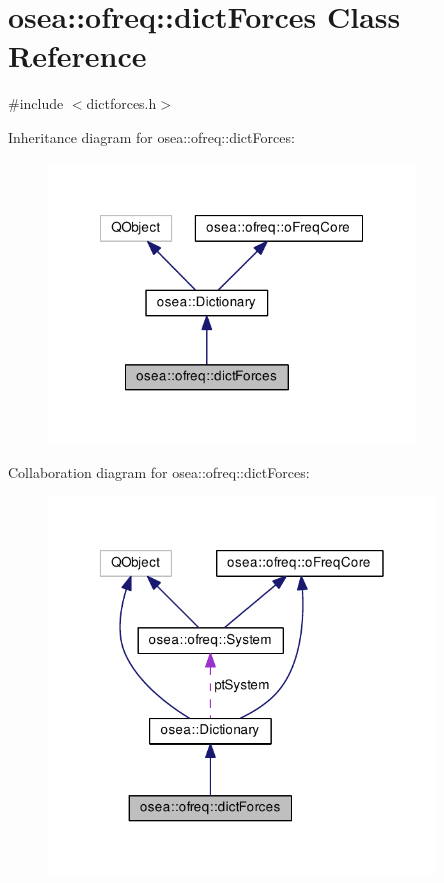 \hypertarget{classosea_1_1ofreq_1_1dict_forces}{\section{osea\-:\-:ofreq\-:\-:dict\-Forces Class Reference}
\label{classosea_1_1ofreq_1_1dict_forces}
}


{\ttfamily \#include $<$dictforces.\-h$>$}



Inheritance diagram for osea\-:\-:ofreq\-:\-:dict\-Forces\-:
\nopagebreak
\begin{figure}[H]
\begin{center}
\leavevmode
\includegraphics[width=275pt]{classosea_1_1ofreq_1_1dict_forces__inherit__graph}
\end{center}
\end{figure}


Collaboration diagram for osea\-:\-:ofreq\-:\-:dict\-Forces\-:
\nopagebreak
\begin{figure}[H]
\begin{center}
\leavevmode
\includegraphics[width=291pt]{classosea_1_1ofreq_1_1dict_forces__coll__graph}
\end{center}
\end{figure}
